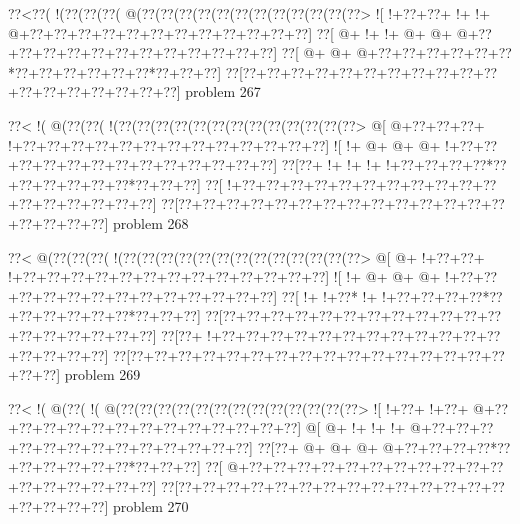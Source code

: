 \vbox{\vbox{\goo
\0??<\0??(\- !(\0??(\0??(\0??(\- @(\0??(\0??(\0??(\0??(\0??(\0??(\0??(\0??(\0??(\0??(\0??(\0??>
\- ![\- !+\0??+\0??+\- !+\- !+\- @+\0??+\0??+\0??+\0??+\0??+\0??+\0??+\0??+\0??+\0??+\0??+\0??]
\0??[\- @+\- !+\- !+\- @+\- @+\- @+\0??+\0??+\0??+\0??+\0??+\0??+\0??+\0??+\0??+\0??+\0??+\0??]
\0??[\- @+\- @+\- @+\0??+\0??+\0??+\0??+\0??+\0??*\0??+\0??+\0??+\0??+\0??+\0??*\0??+\0??+\0??]
\0??[\0??+\0??+\0??+\0??+\0??+\0??+\0??+\0??+\0??+\0??+\0??+\0??+\0??+\0??+\0??+\0??+\0??+\0??]
}
\hfil problem 267\hfil\break
}



\vbox{\vbox{\goo
\0??<\- !(\- @(\0??(\0??(\- !(\0??(\0??(\0??(\0??(\0??(\0??(\0??(\0??(\0??(\0??(\0??(\0??(\0??>
\- @[\- @+\0??+\0??+\0??+\- !+\0??+\0??+\0??+\0??+\0??+\0??+\0??+\0??+\0??+\0??+\0??+\0??+\0??]
\- ![\- !+\- @+\- @+\- @+\- !+\0??+\0??+\0??+\0??+\0??+\0??+\0??+\0??+\0??+\0??+\0??+\0??+\0??]
\0??[\0??+\- !+\- !+\- !+\- !+\0??+\0??+\0??+\0??*\0??+\0??+\0??+\0??+\0??+\0??*\0??+\0??+\0??]
\0??[\- !+\0??+\0??+\0??+\0??+\0??+\0??+\0??+\0??+\0??+\0??+\0??+\0??+\0??+\0??+\0??+\0??+\0??]
\0??[\0??+\0??+\0??+\0??+\0??+\0??+\0??+\0??+\0??+\0??+\0??+\0??+\0??+\0??+\0??+\0??+\0??+\0??]
}
\hfil problem 268\hfil\break
}



\vbox{\vbox{\goo
\0??<\- @(\0??(\0??(\0??(\- !(\0??(\0??(\0??(\0??(\0??(\0??(\0??(\0??(\0??(\0??(\0??(\0??(\0??>
\- @[\- @+\- !+\0??+\0??+\- !+\0??+\0??+\0??+\0??+\0??+\0??+\0??+\0??+\0??+\0??+\0??+\0??+\0??]
\- ![\- !+\- @+\- @+\- @+\- !+\0??+\0??+\0??+\0??+\0??+\0??+\0??+\0??+\0??+\0??+\0??+\0??+\0??]
\0??[\- !+\- !+\0??*\- !+\- !+\0??+\0??+\0??+\0??*\0??+\0??+\0??+\0??+\0??+\0??*\0??+\0??+\0??]
\0??[\0??+\0??+\0??+\0??+\0??+\0??+\0??+\0??+\0??+\0??+\0??+\0??+\0??+\0??+\0??+\0??+\0??+\0??]
\0??[\0??+\- !+\0??+\0??+\0??+\0??+\0??+\0??+\0??+\0??+\0??+\0??+\0??+\0??+\0??+\0??+\0??+\0??]
\0??[\0??+\0??+\0??+\0??+\0??+\0??+\0??+\0??+\0??+\0??+\0??+\0??+\0??+\0??+\0??+\0??+\0??+\0??]
}
\hfil problem 269\hfil\break
}



\vbox{\vbox{\goo
\0??<\- !(\- @(\0??(\- !(\- @(\0??(\0??(\0??(\0??(\0??(\0??(\0??(\0??(\0??(\0??(\0??(\0??(\0??>
\- ![\- !+\0??+\- !+\0??+\- @+\0??+\0??+\0??+\0??+\0??+\0??+\0??+\0??+\0??+\0??+\0??+\0??+\0??]
\- @[\- @+\- !+\- !+\- !+\- @+\0??+\0??+\0??+\0??+\0??+\0??+\0??+\0??+\0??+\0??+\0??+\0??+\0??]
\0??[\0??+\- @+\- @+\- @+\- @+\0??+\0??+\0??+\0??*\0??+\0??+\0??+\0??+\0??+\0??*\0??+\0??+\0??]
\0??[\- @+\0??+\0??+\0??+\0??+\0??+\0??+\0??+\0??+\0??+\0??+\0??+\0??+\0??+\0??+\0??+\0??+\0??]
\0??[\0??+\0??+\0??+\0??+\0??+\0??+\0??+\0??+\0??+\0??+\0??+\0??+\0??+\0??+\0??+\0??+\0??+\0??]
}
\hfil problem 270\hfil\break
}



